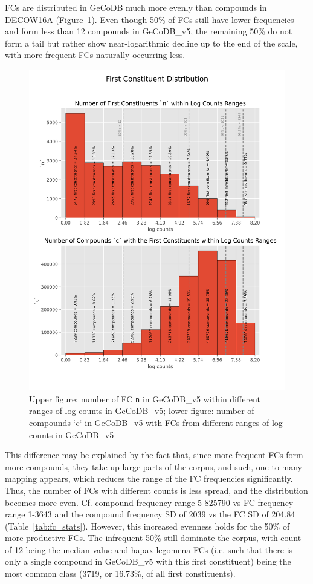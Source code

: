 \documentclass[11pt]{article}
\begin{document}
FCs are distributed in GeCoDB much more evenly than compounds in DECOW16A (Figure~\ref{fig:fc_distr}). Even though 50\% of FCs still have lower frequencies and form less than 12 compounds in GeCoDB\_v5, the remaining 50\% do not form a tail but rather show near-logarithmic decline up to the end of the scale, with more frequent FCs naturally occurring less.

\begin{figure}[hbt!]
    \centering
    \includegraphics[width=\textwidth]{figs/fc_distr_v05.png}
    \caption{Upper figure: number of FC \texttt{n} in GeCoDB\_v5  within different ranges of log counts in GeCoDB\_v5; lower figure: number of compounds `c` in GeCoDB\_v5 with FCs from different ranges of log counts in GeCoDB\_v5}
    \label{fig:fc_distr}
\end{figure}


This difference may be explained by the fact that, since more frequent FCs form more compounds, they take up large parts of the corpus, and such, one-to-many mapping appears, which reduces the range of the FC frequencies significantly. Thus, the number of FCs with different counts is less spread, and the distribution becomes more even. Cf. compound frequency range 5-825790 vs FC frequency range 1-3643 and the compound frequency SD of 2039 vs the FC SD of 204.84 (Table~\ref{tab:fc_stats}). However, this increased evenness holds for the 50\% of more productive FCs. The infrequent 50\% still dominate the corpus, with count of 12 being the median value and hapax legomena FCs (i.e. such that there is only a single compound in GeCoDB\_v5 with this first constituent) being the most common class (3719, or 16.73\%, of all first constituents).
\end{document}
